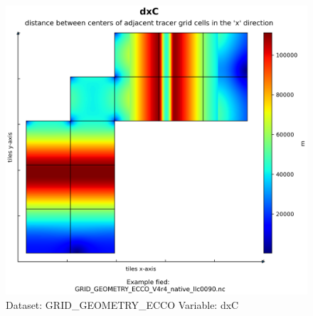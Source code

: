 \begin{figure}[H]
\centering
\includegraphics[scale=0.55]{../images/plots/native_plots_coords/Geometry_Parameters_for_the_Lat-Lon-Cap_90_(llc90)_Native_Model_Grid_(Version_4_Release_4)/dxC.png}
\caption{Dataset: GRID\_GEOMETRY\_ECCO Variable: dxC}
\label{tab:table-GRID_GEOMETRY_ECCO_dxC-Plot}
\end{figure}
\pagebreak
